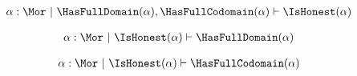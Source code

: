 \begin{sequent}
\begin{align*}
  \alpha:\Mor ~|~ \HasFullDomain( \alpha ), \HasFullCodomain( \alpha ) \vdash \IsHonest( \alpha )
\end{align*}
\end{sequent}

\begin{sequent}
\begin{align*}
  \alpha:\Mor ~|~ \IsHonest( \alpha ) \vdash \HasFullDomain( \alpha )
\end{align*}
\end{sequent}

\begin{sequent}
\begin{align*}
  \alpha:\Mor ~|~ \IsHonest( \alpha ) \vdash \HasFullCodomain( \alpha )
\end{align*}
\end{sequent}
